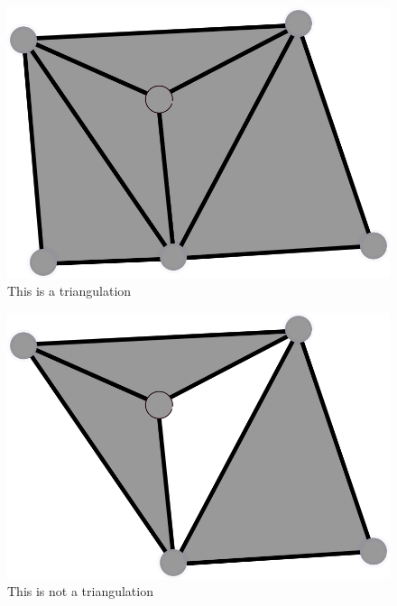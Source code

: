 \documentclass[a4paper,10pt]{article}
\begin{document}
\begin{figure}
  \centering
  
  \includegraphics[scale=2]{Trig1}
  \caption{\label{Trig1} This is a triangulation}
\end{figure}

\begin{figure}
  \centering
  \includegraphics[scale=2]{NotTrig1}
  \caption{\label{NotTrig1} This is not a triangulation}
\end{figure}
\end{document}
